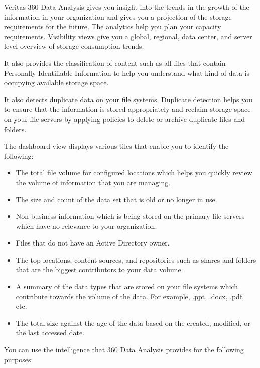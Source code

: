\documentclass[letterpaper,10pt,english]{sphinxmanual}
\begin{document}
Veritas 360 Data Analysis gives you insight into the trends in the growth of the information in your organization and gives you a projection of the storage requirements for the future. The analytics help you plan your capacity requirements. Visibility views give you a  global, regional, data center, and server level overview of storage consumption trends.

It also provides the classification of content such as all files that contain Personally Identifiable Information to help you understand what kind of data is occupying available storage space.

It also detects duplicate data on your file systems. Duplicate detection helps you to ensure that the information is stored appropriately and reclaim storage space on your file servers by applying policies to delete or archive duplicate files and folders.

The dashboard view displays various tiles that enable you to identify the following:
\begin{itemize}
\item {} 
The total file volume for configured locations which helps you quickly review the volume of information that you are managing.

\item {} 
The size and count of the data set that is old or no longer in use.

\item {} 
Non-business information which is being stored on the primary file servers which have no relevance to your organization.

\item {} 
Files that do not have an Active Directory owner.

\item {} 
The top locations, content sources, and repositories such as shares and folders that are the biggest contributors to your data volume.

\item {} 
A summary of the data types that are stored on your file systems which contribute towards the volume of the data. For example, .ppt, .docx, .pdf, etc.

\item {} 
The total size against the age of the data based on the created, modified, or the last accessed date.

\end{itemize}

You can use the intelligence that 360 Data Analysis provides for the following purposes:
\end{document}
